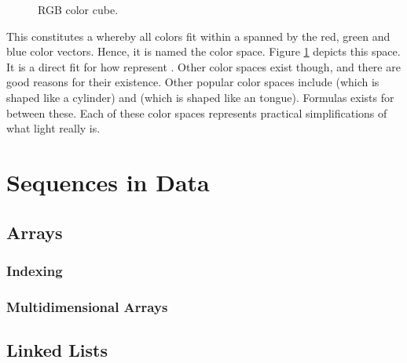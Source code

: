 \begin{figure}[tbp]
  
  \caption{RGB color cube.}
  \label{fig:primdata:struct:color}
\end{figure}

This constitutes a  whereby all colors fit within a  spanned by the red, green and blue color vectors. Hence, it is named the  color space. Figure \ref{fig:primdata:struct:color} depicts this space. It is a direct fit for how  represent . Other color spaces exist though, and there are good reasons for their existence. Other popular color spaces include  (which is shaped like a cylinder) and  (which is shaped like an tongue). Formulas exists for  between these. Each of these color spaces represents practical simplifications of what light really is.

\csharpsubsection{\csharp}


\begin{syntaxfloat}
  
  \caption{Structured data}
  \label{syntax:data:struct}
\end{syntaxfloat}

\section{Sequences in Data}

\subsection{Arrays}

\subsubsection{Indexing}


\subsubsection{Multidimensional Arrays}

\subsection{Linked Lists}

